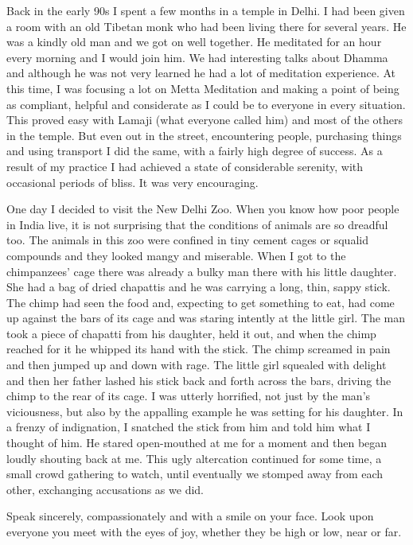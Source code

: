 \documentclass[10pt, openright]{book}
\newenvironment{epigram-2}%
{%
\vspace{1em}
\noindent
\quoting[leftmargin=2.5cm,rightmargin=2.5cm]%
\begin{itshape}
\large
}%
{\end{itshape}\endquoting
}%
\begin{document}
Back in the early 90s I spent a few months in a temple in Delhi. I had been given a room with an old Tibetan monk who had been living there for several years. He was a kindly old man and we got on well together. He meditated for an hour every morning and I would join him. We had interesting talks about Dhamma and although he was not very learned he had a lot of meditation experience. At this time, I was focusing a lot on Metta Meditation and making a point of being as compliant, helpful and considerate as I could be to everyone in every situation. This proved easy with Lamaji (what everyone called him) and most of the others in the temple. But even out in the street, encountering people, purchasing things and using transport I did the same, with a fairly high degree of success. As a result of my practice I had achieved a state of considerable serenity, with occasional periods of bliss. It was very encouraging.


One day I decided to visit the New Delhi Zoo. When you know how poor people in India live, it is not surprising that the conditions of animals are so dreadful too. The animals in this zoo were confined in tiny cement cages or squalid compounds and they looked mangy and miserable. When I got to the chimpanzees’ cage there was already a bulky man there with his little daughter. She had a bag of dried chapattis and he was carrying a long, thin, sappy stick. The chimp had seen the food and, expecting to get something to eat, had come up against the bars of its cage and was staring intently at the little girl. The man took a piece of chapatti from his daughter, held it out, and when the chimp reached for it he whipped its hand with the stick. The chimp screamed in pain and then jumped up and down with rage. The little girl squealed with delight and then her father lashed his stick back and forth across the bars, driving the chimp to the rear of its cage. I was utterly horrified, not just by the man’s viciousness, but also by the appalling example he was setting for his daughter. In a frenzy of indignation, I snatched the stick from him and told him what I thought of him. He stared open-mouthed at me for a moment and then began loudly shouting back at me. This ugly altercation continued for some time, a small crowd gathering to watch, until eventually we stomped away from each other, exchanging accusations as we did.


\begin{epigram-2}
Speak sincerely, compassionately and with a smile on your face. Look upon everyone you meet with the eyes of joy, whether they be high or low, near or far.
\end{epigram-2}
\end{document}

